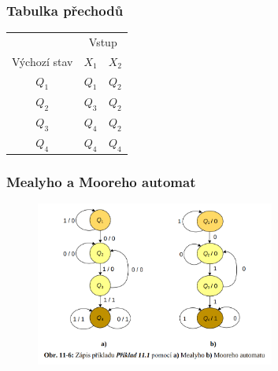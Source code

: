\subsubsection{Tabulka přechodů}

\begin{table}[ht]
    \begin{tabular}{ccc}
    \hline
                 & \multicolumn{2}{c}{Vstup} \\
    Výchozí stav & $X_1$       & $X_2$       \\\hline
    $Q_1$        & $Q_1$       & $Q_2$       \\
    $Q_2$        & $Q_3$       & $Q_2$       \\
    $Q_3$        & $Q_4$       & $Q_2$       \\
    $Q_4$        & $Q_4$       & $Q_4$       \\\hline
    \end{tabular}
\end{table}

\subsubsection{Mealyho a Mooreho automat}

\begin{figure}[!h]
    \centering
    \includegraphics[width=0.7\textwidth]{obrazky/100.png}
\end{figure}

